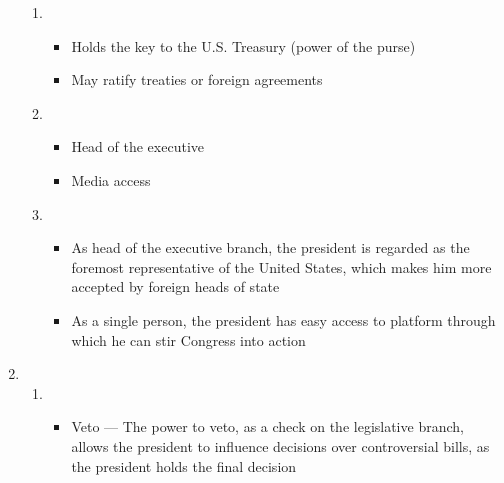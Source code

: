 \documentclass[12pt]{article}
\begin{document}
\begin{enumerate}
\begin{enumerate}
      \item

        \begin{itemize}

          \item Holds the key to the U.S. Treasury (power of the purse)

          \item May ratify treaties or foreign agreements

        \end{itemize}

      \item

        \begin{itemize}

          \item Head of the executive

          \item Media access

        \end{itemize}

      \item

        \begin{itemize}

          \item As head of the executive branch, the president is regarded as the foremost representative of the United States, which makes him more accepted by foreign heads of state

          \item As a single person, the president has easy access to platform through which he can stir Congress into action

        \end{itemize}

    \end{enumerate}

  \item

    \begin{enumerate}

      \item 

        \begin{itemize}

          \item Veto — The power to veto, as a check on the legislative branch, allows the president to influence decisions over controversial bills, as the president holds the final decision


\end{itemize}
\end{enumerate}
\end{enumerate}
\end{document}

